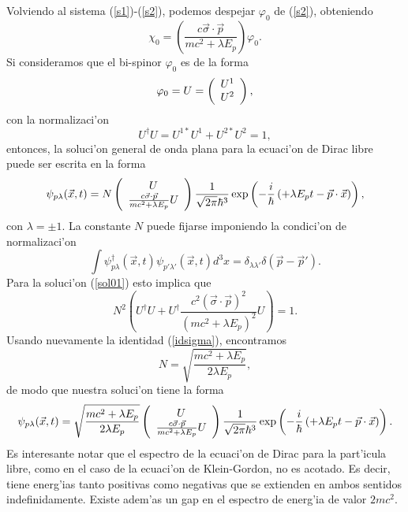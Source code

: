Volviendo al sistema (\ref{s1})-(\ref{s2}), podemos despejar $\varphi_0$ de
(\ref{s2}), obteniendo
\begin{equation}
\chi_0=\left( \frac{c\vec{\sigma}\cdot\vec{p}}{mc^2+\lambda E_p}\right)
\varphi_0 .
\end{equation} 
Si consideramos que el bi-spinor $\varphi_0$ es de la forma
\begin{equation}
\varphi_0=U=\left(
\begin{array}
[c]{c}
U^1\\
U^2
\end{array}
\right),
\end{equation} 
con la normalizaci'on
\begin{equation}
U^{\dagger}U=U^{1\ast}U^1+U^{2\ast}U^2=1,
\end{equation} 
entonces, la soluci'on general de onda plana para la ecuaci'on de Dirac libre
puede ser escrita en la forma 
\begin{equation}\label{sol01}
\psi_{p\lambda}(\vec{x},t) =N\left(
\begin{array}
[c]{c}%
U\\
\frac{c\vec{\sigma}\cdot\vec{p}}{mc^2+\lambda E_{p}}U
\end{array}
\right) \frac{1}{\sqrt{2\pi}\hbar^{3}}\exp\left( 
-\frac{i}{\hbar}\left(+\lambda E_{p}t-\vec{p}\cdot\vec{x}	\right) 
\right),
\end{equation}
con $\lambda=\pm1$. La constante $N$ puede fijarse imponiendo la condici'on de
normalizaci'on
\begin{equation}
\int\psi_{p\lambda}^{\dagger}(\vec{x},t) \psi_{p'%
\lambda'}(\vec{x},t) d^{3}x=\delta_{\lambda\lambda'%
}\delta\left( \vec{p}-\vec{p}'\right).
\end{equation}
Para la soluci'on (\ref{sol01}) esto implica que
\begin{equation}
N^2\left( U^{\dagger}U+U^{\dagger}\frac{c^2\left(
\vec{\sigma}\cdot\vec{p}\right)^2}{\left( mc^2+\lambda E_{p}\right) 
^2}U\right)=1.
\end{equation}
Usando nuevamente la identidad (\ref{idsigma}), encontramos
\begin{equation}
N=\sqrt{\frac{mc^2+\lambda E_{p}}{2\lambda E_{p}}},
\end{equation}
de modo que nuestra soluci'on tiene la forma
\begin{equation}\label{sol02}
\psi_{p\lambda}(\vec{x},t) =\sqrt{\frac{mc^2+\lambda E_{p}}{2\lambda
E_{p}}}\left(
\begin{array}
[c]{c}%
U\\
\frac{c\vec{\sigma}\cdot\vec{p}}{mc^2+\lambda E_{p}}U
\end{array}
\right) \frac{1}{\sqrt{2\pi}\hbar^{3}}\exp\left( 
-\frac{i}{\hbar}\left(+\lambda E_{p}t-\vec{p}\cdot\vec{x}	\right) 
\right).
\end{equation}
Es interesante notar que el espectro de la ecuaci'on de Dirac para la part'icula
libre, como en el caso de la ecuaci'on de Klein-Gordon, no es acotado. Es decir,
tiene energ'ias tanto positivas como negativas que se extienden en ambos
sentidos indefinidamente. Existe adem'as un gap en el espectro de energ'ia de
valor $2mc^2$.

